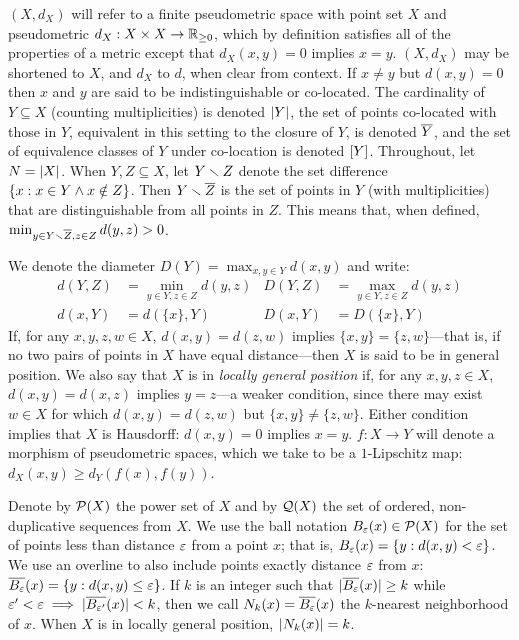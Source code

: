 \documentclass{article}
\begin{document}
\((X, d_X)\) will refer to a finite pseudometric space with point set
\(X\) and pseudometric \(d_X:X\times X\to\mathbb{R}_{\geq 0}\), which by
definition satisfies all of the properties of a metric except that
\(d_X(x,y)=0\) implies \(x=y\). \((X,d_X)\) may be shortened to \(X\),
and \(d_X\) to \(d\), when clear from context. If \(x\neq y\) but
\(d(x,y)=0\) then \(x\) and \(y\) are said to be indistinguishable or
co-located. The cardinality of \(Y\subseteq X\) (counting
multiplicities) is denoted \(\lvert Y\rvert\), the set of points co-located
with those in \(Y\), equivalent in this setting to the closure of \(Y\),
is denoted \(\overline{Y}\), and the set of equivalence classes of \(Y\) under
co-location is denoted \([Y]\). Throughout, let \(N=\lvert X\rvert\). When
\(Y,Z\subseteq X\), let \(Y\smallsetminus Z\) denote the set difference
\(\{x : x \in Y \wedge x \notin Z\}\). Then \(Y \smallsetminus \overline{Z}\) is the
set of points in \(Y\) (with multiplicities) that are distinguishable
from all points in \(Z\). This means that, when defined,
\(\min_{y\in Y\smallsetminus \overline{Z},z\in Z}{d(y, z)}>0\).

We denote the diameter \(D(Y)=\max_{x,y\in Y}{d(x,y)}\) and write:
\begin{align*}
d(Y,Z) &= \min_{y\in Y,z\in Z}{d(y,z)} & D(Y,Z) &= \max_{y\in Y,z\in Z}{d(y,z)} \\
d(x,Y) &= d(\{x\},Y)                   & D(x,Y) &= D(\{x\},Y)
\end{align*} If, for any \(x,y,z,w \in X\), \(d(x,y)=d(z,w)\) implies
\(\{x,y\}=\{z,w\}\)---that is, if no two pairs of points in \(X\) have
equal distance---then \(X\) is said to be in general position. We also
say that \(X\) is in \emph{locally general position} if, for any
\(x,y,z \in X\), \(d(x,y)=d(x,z)\) implies \(y=z\)---a weaker condition,
since there may exist \(w \in X\) for which \(d(x,y)=d(z,w)\) but
\(\{x,y\}\neq\{z,w\}\). Either condition implies that \(X\) is
Hausdorff: \(d(x,y)=0\) implies \(x=y\). \(f:X \to Y\) will denote a
morphism of pseudometric spaces, which we take to be a \(1\)-Lipschitz
map: \(d_X(x,y)\geq d_Y(f(x),f(y))\).

Denote by \(\mathcal{P}(X)\) the power set of \(X\) and by \(\mathcal{Q}(X)\) the
set of ordered, non-duplicative sequences from \(X\). We use the ball
notation \(B_{\varepsilon}(x) \in \mathcal{P}(X)\) for the set of points less than
distance \(\varepsilon\) from a point \(x\); that is,
\(B_{\varepsilon}(x) = \{ y : d(x,y) < \varepsilon \}\). We use an overline to
also include points exactly distance \(\varepsilon\) from \(x\):
\(\overline{B_{\varepsilon}}(x) = \{ y : d(x,y) \leq \varepsilon \}\). If \(k\) is an
integer such that \(\lvert \overline{B_\varepsilon}(x)\rvert \geq k\) while
\(\varepsilon'<\varepsilon \implies \lvert \overline{B_{\varepsilon'}}(x)\rvert < k\), then we call
\(N_k(x) = \overline{B_\varepsilon}(x)\) the \(k\)-nearest neighborhood of \(x\).
When \(X\) is in locally general position, \(\lvert N_k(x)\rvert = k\).
\end{document}

